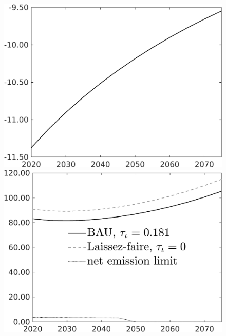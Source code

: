 \begin{figure}[h!!]
\begin{minipage}[]{0.32\textwidth}
	\end{minipage}	
	\begin{minipage}[]{0.32\textwidth}
		\includegraphics[width=1\textwidth]{../../codding_model/own_basedOnFried/optimalPol_010922_revision/figures/all_13Sept22/CompTaul_Equlab_LFBAUPer_Reg0_C_spillover0_nsk1_xgr1_knspil0_sep1_countec0_GovRev1_etaa0.79.png}
	\end{minipage}	
	\begin{minipage}[]{0.32\textwidth}
	\includegraphics[width=1\textwidth]{../../codding_model/own_basedOnFried/optimalPol_010922_revision/figures/all_13Sept22/CompTaul_Equlab_LFBAU_Reg0_Emnet_spillover0_nsk1_xgr1_knspil0_sep1_countec0_GovRev1_etaa0.79_lgd1.png}

\end{minipage}
\end{figure}
